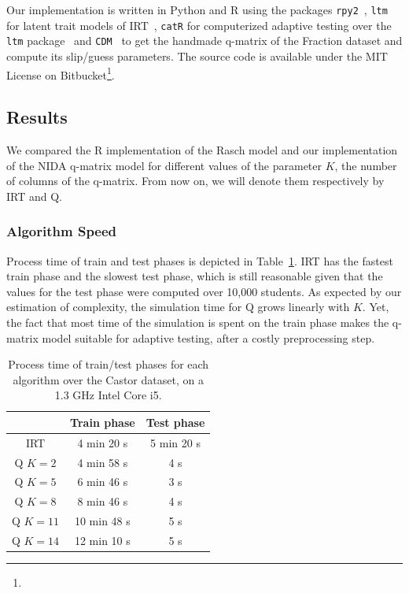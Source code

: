 \documentclass{edm_template}
\begin{document}
Our implementation is written in Python and R using the packages \texttt{rpy2}~\cite{Gautier2008}, \texttt{ltm} for latent trait models of IRT~\cite{Rizopoulos2006}, \texttt{catR} for computerized adaptive testing over the \texttt{ltm} package~\cite{MagisRaiche2012} and \texttt{CDM}~\cite{Robitzsch2014} to get the handmade q-matrix of the Fraction dataset and compute its slip/guess parameters. The source code is available under the MIT License on Bitbucket\footnote{}. %

\subsection{Results}

We compared the R implementation of the Rasch model and our implementation of the NIDA q-matrix model for different values of the parameter $K$, the number of columns of the q-matrix. From now on, we will denote them respectively by IRT and Q.

\subsubsection{Algorithm Speed}

Process time of train and test phases is depicted in Table~\ref{tab:time}. IRT has the fastest train phase and the slowest test phase, which is still reasonable given that the values for the test phase were computed over 10,000 students. As expected by our estimation of complexity, the simulation time for Q grows linearly with $K$. Yet, the fact that most time of the simulation is spent on the train phase makes the q-matrix model suitable for adaptive testing, after a costly preprocessing step.

\begin{table}[H]
\centering\begin{tabular}{@{}c|cc@{}}
& Train phase & Test phase\\
\hline
IRT & 4 min 20 s & 5 min 20 s\\%
Q $K = 2$ & 4 min 58 s & 4 s\\
Q $K = 5$ & 6 min 46 s & 3 s\\
Q $K = 8$ & 8 min 46 s & 4 s\\ %
Q $K = 11$ & 10 min 48 s & 5 s\\ %
Q $K = 14$ & 12 min 10 s & 5 s\\ %
\end{tabular}
\caption{Process time of train/test phases for each algorithm over the Castor dataset, on a 1.3 GHz Intel Core i5.}
\label{tab:time}
\end{table}
\end{document}
